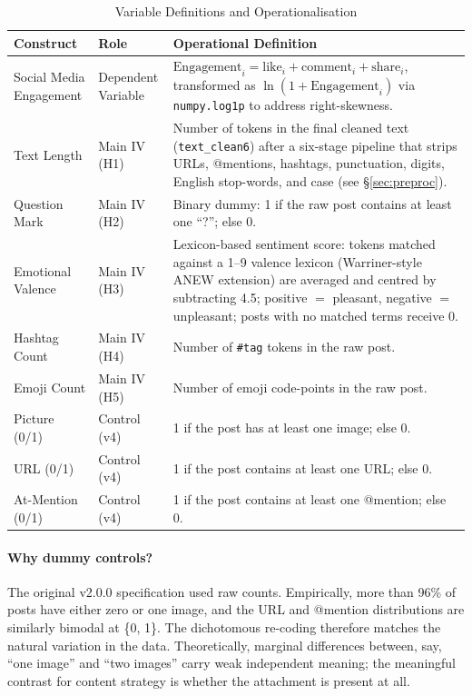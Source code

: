 \documentclass[12pt,a4paper]{article}
\begin{document}
\begin{table}[H]
\centering
\caption{Variable Definitions and Operationalisation}
\small
\begin{tabular}{@{}p{} p{} p{}@{}}
\toprule
Construct & Role & Operational Definition \\
\midrule
Social Media Engagement & Dependent Variable & $\text{Engagement}_i = \text{like}_i + \text{comment}_i + \text{share}_i$, transformed as $\ln(1+\text{Engagement}_i)$ via \texttt{numpy.log1p} to address right-skewness. \\
\midrule
Text Length & Main IV (H1) & Number of tokens in the final cleaned text (\texttt{text\_clean6}) after a six-stage pipeline that strips URLs, @mentions, hashtags, punctuation, digits, English stop-words, and case (see §\ref{sec:preproc}). \\
Question Mark & Main IV (H2) & Binary dummy: 1 if the raw post contains at least one ``?''; else 0. \\
Emotional Valence & Main IV (H3) & Lexicon-based sentiment score: tokens matched against a 1--9 valence lexicon (Warriner-style ANEW extension) are averaged and centred by subtracting 4.5; positive $=$ pleasant, negative $=$ unpleasant; posts with no matched terms receive 0. \\
Hashtag Count & Main IV (H4) & Number of \texttt{\#tag} tokens in the raw post. \\
Emoji Count & Main IV (H5) & Number of emoji code-points in the raw post. \\
\midrule
Picture (0/1) & Control (v4) & 1 if the post has at least one image; else 0. \\
URL (0/1) & Control (v4) & 1 if the post contains at least one URL; else 0. \\
At-Mention (0/1) & Control (v4) & 1 if the post contains at least one @mention; else 0. \\
\bottomrule
\end{tabular}
\end{table}

\paragraph{Why dummy controls?} The original v2.0.0 specification used raw counts. Empirically, more than 96\% of posts have either zero or one image, and the URL and @mention distributions are similarly bimodal at \{0, 1\}. The dichotomous re-coding therefore matches the natural variation in the data. Theoretically, marginal differences between, say, ``one image'' and ``two images'' carry weak independent meaning; the meaningful contrast for content strategy is whether the attachment is present at all.
\end{document}
